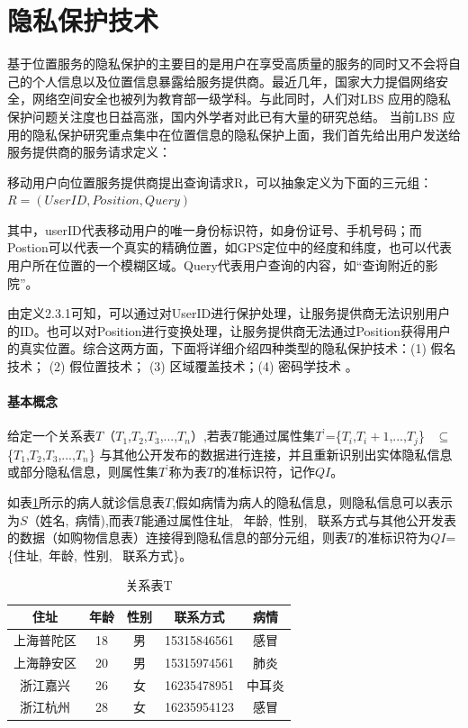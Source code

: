 \section{隐私保护技术}
基于位置服务的隐私保护的主要目的是用户在享受高质量的服务的同时又不会将自己的个人信息以及位置信息暴露给服务提供商。最近几年，国家大力提倡网络安全，网络空间安全也被列为教育部一级学科。与此同时，人们对LBS 应用的隐私保护问题关注度也日益高涨，国内外学者对此已有大量的研究总结\cite{group}\cite{Beresford}\cite{ChengR}。 当前LBS 应用的隐私保护研究重点集中在位置信息的隐私保护上面，我们首先给出用户发送给服务提供商的服务请求定义：
\begin{define}[：LBS服务请求]
移动用户向位置服务提供商提出查询请求R，可以抽象定义为下面的三元组：
$R=(UserID,Position,Query)$
\end{define}
其中，userID代表移动用户的唯一身份标识符，如身份证号、手机号码；而Postion可以代表一个真实的精确位置，如GPS定位中的经度和纬度，也可以代表用户所在位置的一个模糊区域。Query代表用户查询的内容，如“查询附近的影院”。

由定义2.3.1可知，可以通过对UserID进行保护处理，让服务提供商无法识别用户的ID。也可以对Position进行变换处理，让服务提供商无法通过Position获得用户的真实位置。综合这两方面，下面将详细介绍四种类型的隐私保护技术：(1) 假名技术； (2) 假位置技术； (3) 区域覆盖技术；(4) 密码学技术 。
\paragraph{基本概念}
\begin{define}[准标识符]
给定一个关系表$T$（$T_1$,$T_2$,$T_3$,...,$T_n$）,若表$T$能通过属性集$T^’$=\{$T_i$,$T_i+1$,...,$T_j$\} ~$\subseteq$~ \{$T_1$,$T_2$,$T_3$,...,$T_n$\} 与其他公开发布的数据进行连接，并且重新识别出实体隐私信息或部分隐私信息，则属性集$T^’$称为表$T$的准标识符，记作$QI$。
\end{define}

如表\ref{k-anony}所示的病人就诊信息表$T$,假如病情为病人的隐私信息，则隐私信息可以表示为$S$（姓名,~病情),而表$T$能通过属性{住址,~ 年龄,~性别,~ 联系方式}与其他公开发表的数据（如购物信息表）连接得到隐私信息的部分元组，则表$T$的准标识符为$QI$=\{住址,~年龄,~性别,~ 联系方式\}。
\begin{table}[H]
\label{k-anony}
\centering  %
\begin{tabular}{ccccc}  %
\hline
住址 &年龄&性别 &联系方式&病情\\ \hline  %
上海普陀区&18 &男 &15315846561 &感冒\\         %
上海静安区 &20 &男 &15315974561 &肺炎\\        %
浙江嘉兴 &26 &女 &16235478951 &中耳炎\\
浙江杭州 &28 &女 &16235954123 &感冒\\ \hline
\end{tabular}
\caption{关系表T}
\end{table}

